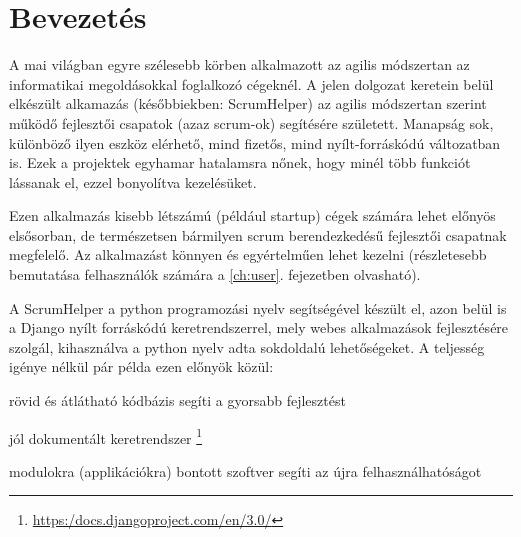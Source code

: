 \chapter{Bevezetés} %
\label{ch:intro}

A mai világban egyre szélesebb körben alkalmazott az agilis módszertan az informatikai megoldásokkal foglalkozó cégeknél. A jelen dolgozat keretein belül elkészült alkamazás (későbbiekben: ScrumHelper) az agilis módszertan szerint működő fejlesztői csapatok (azaz scrum-ok) segítésére született. Manapság sok, különböző ilyen eszköz elérhető, mind fizetős, mind nyílt-forráskódú változatban is. Ezek a projektek egyhamar hatalamsra nőnek, hogy minél több funkciót lássanak el, ezzel bonyolítva kezelésüket.

 Ezen alkalmazás kisebb létszámú (például startup) cégek számára lehet előnyös elsősorban, de természetsen bármilyen scrum berendezkedésű fejlesztői csapatnak megfelelő. Az alkalmazást könnyen és egyértelműen lehet kezelni (részletesebb bemutatása felhasználók számára a \ref{ch:user}. fejezetben olvasható). 

A ScrumHelper a python programozási nyelv segítségével készült el, azon belül is a Django nyílt forráskódú keretrendszerrel, mely webes alkalmazások fejlesztésére szolgál, kihasználva a python nyelv adta  sokdoldalú lehetőségeket. A teljesség igénye nélkül pár példa ezen előnyök közül: 
\begin{compactitem}
	\item rövid és átlátható kódbázis segíti a gyorsabb fejlesztést
	\item jól dokumentált keretrendszer \footnote{\url{https:/docs.djangoproject.com/en/3.0/}}
	\item modulokra (applikációkra) bontott szoftver segíti az újra felhasználhatóságot
\end{compactitem}

